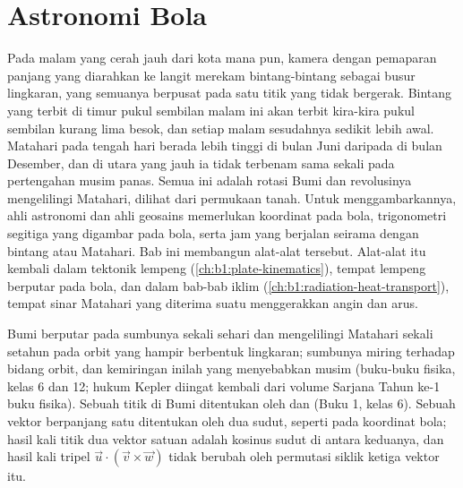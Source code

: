 \chapter{Astronomi Bola}\label{ch:b1:spherical-astronomy}

Pada malam yang cerah jauh dari kota mana pun, kamera dengan pemaparan panjang yang diarahkan ke langit merekam bintang-bintang sebagai busur lingkaran, yang semuanya berpusat pada satu titik yang tidak bergerak. Bintang yang terbit di timur pukul sembilan malam ini akan terbit kira-kira pukul sembilan kurang lima besok, dan setiap malam sesudahnya sedikit lebih awal. Matahari pada tengah hari berada lebih tinggi di bulan Juni daripada di bulan Desember, dan di utara yang jauh ia tidak terbenam sama sekali pada pertengahan musim panas. Semua ini adalah rotasi Bumi dan revolusinya mengelilingi Matahari, dilihat dari permukaan tanah. Untuk menggambarkannya, ahli astronomi dan ahli geosains memerlukan koordinat pada bola, trigonometri segitiga yang digambar pada bola, serta jam yang berjalan seirama dengan bintang atau Matahari. Bab ini membangun alat-alat tersebut. Alat-alat itu kembali dalam tektonik lempeng (\cref{ch:b1:plate-kinematics}), tempat lempeng berputar pada bola, dan dalam bab-bab iklim (\cref{ch:b1:radiation-heat-transport}), tempat sinar Matahari yang diterima suatu  menggerakkan angin dan arus.

\begin{recall}
Bumi berputar pada sumbunya sekali sehari dan mengelilingi Matahari sekali setahun pada orbit yang hampir berbentuk lingkaran; sumbunya miring terhadap bidang orbit, dan kemiringan inilah yang menyebabkan musim (buku-buku fisika, kelas 6 dan 12; hukum Kepler diingat kembali dari volume Sarjana Tahun ke-1 buku fisika). Sebuah titik di Bumi ditentukan oleh  dan  (Buku 1, kelas 6). Sebuah vektor berpanjang satu ditentukan oleh dua sudut, seperti pada koordinat bola; hasil kali titik dua vektor satuan adalah kosinus sudut di antara keduanya, dan hasil kali tripel $\vec u\cdot(\vec v\times\vec w)$ tidak berubah oleh permutasi siklik ketiga vektor itu.
\end{recall}

